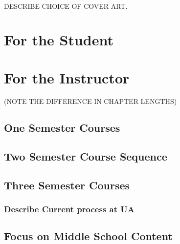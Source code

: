 \documentclass[
]{book}
\theoremstyle{definition}
\theoremstyle{definition}
\theoremstyle{definition}
\theoremstyle{definition}
\theoremstyle{remark}
\begin{document}
DESCRIBE CHOICE OF COVER ART.

\hypertarget{for-the-student}{%
\section*{For the Student}\label{for-the-student}}

\hypertarget{for-the-instructor}{%
\section*{For the Instructor}\label{for-the-instructor}}

(NOTE THE DIFFERENCE IN CHAPTER LENGTHS)

\hypertarget{one-semester-courses}{%
\subsection*{One Semester Courses}\label{one-semester-courses}}

\hypertarget{two-semester-course-sequence}{%
\subsection*{Two Semester Course Sequence}\label{two-semester-course-sequence}}

\hypertarget{three-semester-courses}{%
\subsection*{Three Semester Courses}\label{three-semester-courses}}

\hypertarget{describe-current-process-at-ua}{%
\subsubsection*{Describe Current process at UA}\label{describe-current-process-at-ua}}

\hypertarget{focus-on-middle-school-content}{%
\subsection*{Focus on Middle School Content}\label{focus-on-middle-school-content}}
\end{document}
